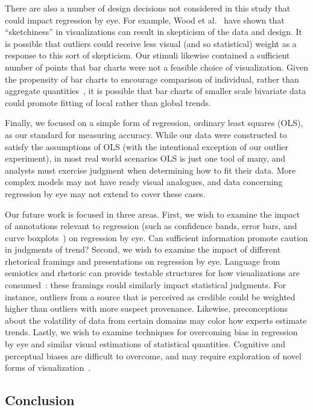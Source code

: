 \documentclass{sigchi}
\begin{document}
There are also a number of design decisions not considered in this study that could impact regression by eye. For example, Wood et al.~\cite{wood2012sketchy} have shown that ``sketchiness'' in visualizations can result in skepticism of the data and design. It is possible that outliers could receive less visual (and so statistical) weight as a response to this sort of skepticism. Our stimuli likewise contained a sufficient number of points that bar charts were not a feasible choice of visualization. Given the propensity of bar charts to encourage comparison of individual, rather than aggregate quantities~\cite{zacks1999bars}, it is possible that bar charts of smaller scale bivariate data could promote fitting of local rather than global trends.

Finally, we focused on a simple form of regression, ordinary least squares (OLS), as our standard for measuring accuracy. While our data were constructed to satisfy the assumptions of OLS (with the intentional exception of our outlier experiment), in most real world scenarios OLS is just one tool of many, and analysts must exercise judgment when determining how to fit their data. More complex models may not have ready visual analogues, and data concerning regression by eye may not extend to cover these cases.

Our future work is focused in three areas. First, we wish to examine the impact of annotations relevant to regression (such as confidence bands, error bars, and curve boxplots~\cite{mirzargar2014curve}) on regression by eye. Can sufficient information promote caution in judgments of trend? Second, we wish to examine the impact of different rhetorical framings and presentations on regression by eye. Language from semiotics and rhetoric can provide testable structures for how visualizations are consumed~\cite{hullman2011visualization}: these framings could similarly impact statistical judgments. For instance, outliers from a source that is perceived as credible could be weighted higher than outliers with more suspect provenance. Likewise, preconceptions about the volatility of data from certain domains may color how experts estimate trends. Lastly, we wish to examine techniques for overcoming bias in regression by eye and similar visual estimations of statistical quantities. Cognitive and perceptual biases are difficult to overcome, and may require exploration of novel forms of visualization~\cite{micallef2012assessing}.

\subsection{Conclusion}
\end{document}
